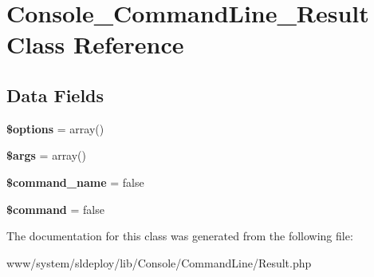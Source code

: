 \hypertarget{class_console___command_line___result}{
\section{Console\_\-CommandLine\_\-Result Class Reference}
\label{class_console___command_line___result}
}
\subsection*{Data Fields}
\begin{DoxyCompactItemize}
\item 
\hypertarget{class_console___command_line___result_a011800c63ece4cbbfa77136a20607023}{
{\bfseries \$options} = array()}
\label{class_console___command_line___result_a011800c63ece4cbbfa77136a20607023}

\item 
\hypertarget{class_console___command_line___result_a67e94494731d99ed23b123e95175bc10}{
{\bfseries \$args} = array()}
\label{class_console___command_line___result_a67e94494731d99ed23b123e95175bc10}

\item 
\hypertarget{class_console___command_line___result_afe9b5e10f31d1f71aacfa3a27572f0e8}{
{\bfseries \$command\_\-name} = false}
\label{class_console___command_line___result_afe9b5e10f31d1f71aacfa3a27572f0e8}

\item 
\hypertarget{class_console___command_line___result_a8f120409eb9f635ac30b3f9a6d5becdc}{
{\bfseries \$command} = false}
\label{class_console___command_line___result_a8f120409eb9f635ac30b3f9a6d5becdc}

\end{DoxyCompactItemize}


The documentation for this class was generated from the following file:\begin{DoxyCompactItemize}
\item 
www/system/sldeploy/lib/Console/CommandLine/Result.php\end{DoxyCompactItemize}
